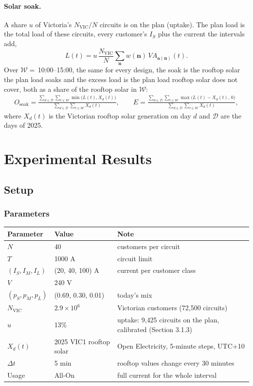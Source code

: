 \documentclass[11pt,a4paper]{article}
\newcommand{\bn}{\boldsymbol n}
\newcommand{\ba}{\boldsymbol a}
\begin{document}
\paragraph{Solar soak.}
A share \(u\) of Victoria's \(N_{\mathrm{VIC}}/N\) circuits is on the plan (uptake). The plan load is
the total load of these circuits, every customer's \(I_S\) plus the current the intervals add,
\begin{equation}
  L(t)=u\,\frac{N_{\mathrm{VIC}}}{N}\sum_{\bn}w(\bn)\,VA_{\ba(\bn)}(t).
\end{equation}
Over \(\mathcal W=\)\,10:00--15:00, the same for every design, the soak is the rooftop solar the plan load
soaks and the excess load is the plan load rooftop solar does not cover, both as a share of the rooftop
solar in \(\mathcal W\):
\begin{gather}
  O_{\mathrm{soak}}=\frac{\sum_{d\in\mathcal D}\sum_{t\in\mathcal W}\min\bigl(L(t),X_d(t)\bigr)}
  {\sum_{d\in\mathcal D}\sum_{t\in\mathcal W}X_d(t)},\qquad
  E=\frac{\sum_{d\in\mathcal D}\sum_{t\in\mathcal W}\max\bigl(L(t)-X_d(t),\,0\bigr)}
  {\sum_{d\in\mathcal D}\sum_{t\in\mathcal W}X_d(t)},
\end{gather}
where \(X_d(t)\) is the Victorian rooftop solar generation on day \(d\) and \(\mathcal D\) are the days of
2025.

\section{Experimental Results}

\subsection{Setup}

\subsubsection{Parameters}
\begin{center}\small
\begin{tabular}{lll}
\toprule
Parameter & Value & Note\\
\midrule
\(N\) & 40 & customers per circuit\\
\(T\) & 1000 A & circuit limit\\
\((I_S,I_M,I_L)\) & (20, 40, 100) A & current per customer class\\
\(V\) & 240 V & \\
\((p_S,p_M,p_L)\) & (0.69, 0.30, 0.01) & today's mix\\
\(N_{\mathrm{VIC}}\) & \(2.9\times10^6\) & Victorian customers (72{,}500 circuits)\\
\(u\) & 13\% & uptake: 9{,}425 circuits on the plan, calibrated (Section 3.1.3)\\
\(X_d(t)\) & 2025 VIC1 rooftop solar & Open Electricity, 5-minute steps, UTC+10\\
\(\Delta t\) & 5 min & rooftop values change every 30 minutes\\
Usage & All-On & full current for the whole interval\\
\bottomrule
\end{tabular}
\end{center}
\end{document}
